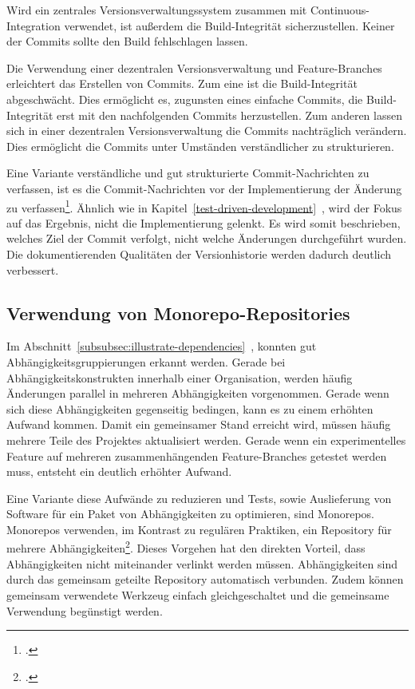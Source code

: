 Wird ein zentrales Versionsverwaltungssystem zusammen mit Continuous-Integration verwendet, ist außerdem die Build-Integrität sicherzustellen. Keiner der Commits sollte den Build fehlschlagen lassen. 

Die Verwendung einer dezentralen Versionsverwaltung und Feature-Branches erleichtert das Erstellen von Commits. Zum eine ist die Build-Integrität abgeschwächt. Dies ermöglicht es, zugunsten eines einfache Commits, die Build-Integrität erst mit den nachfolgenden Commits herzustellen. Zum anderen lassen sich in einer dezentralen Versionsverwaltung die Commits nachträglich verändern. Dies ermöglicht die Commits unter Umständen verständlicher zu strukturieren.

Eine Variante verständliche und gut strukturierte Commit-Nachrichten zu verfassen, ist es die Commit-Nachrichten vor der Implementierung der Änderung zu verfassen\footcite[Writing commit messages before starting to code][]{git-essentials-2017}. Ähnlich wie in Kapitel~\ref{test-driven-development}~, wird der Fokus auf das Ergebnis, nicht die Implementierung gelenkt. Es wird somit beschrieben, welches Ziel der Commit verfolgt, nicht welche Änderungen durchgeführt wurden. Die dokumentierenden Qualitäten der Versionhistorie werden dadurch deutlich verbessert.

\subsection{Verwendung von Monorepo-Repositories}

Im Abschnitt~\ref{subsubsec:illustrate-dependencies}~\glqq {}\grqq{}, konnten gut Abhängigkeitsgruppierungen erkannt werden. Gerade bei Abhängigkeitskonstrukten innerhalb einer Organisation, werden häufig Änderungen parallel in mehreren Abhängigkeiten vorgenommen. Gerade wenn sich diese Abhängigkeiten gegenseitig bedingen, kann es zu einem erhöhten Aufwand kommen. Damit ein gemeinsamer Stand erreicht wird, müssen häufig mehrere Teile des Projektes aktualisiert werden. Gerade wenn ein experimentelles Feature auf mehreren zusammenhängenden Feature-Branches getestet werden muss, entsteht ein deutlich erhöhter Aufwand.

Eine Variante diese Aufwände zu reduzieren und Tests, sowie Auslieferung von Software für ein Paket von Abhängigkeiten zu optimieren, sind Monorepos. Monorepos verwenden, im Kontrast zu regulären Praktiken, ein Repository für mehrere Abhängigkeiten\footcite{trunkbaseddevelopment-monorepo}. Dieses Vorgehen hat den direkten Vorteil, dass Abhängigkeiten nicht miteinander verlinkt werden müssen. Abhängigkeiten sind durch das gemeinsam geteilte Repository automatisch verbunden. Zudem können gemeinsam verwendete Werkzeug einfach gleichgeschaltet und die gemeinsame Verwendung begünstigt werden.

